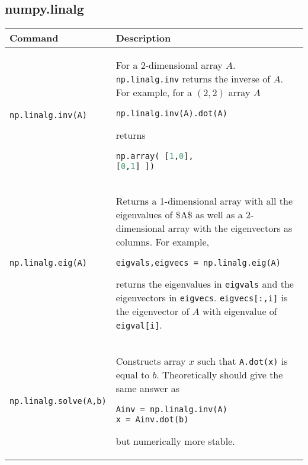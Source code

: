 \documentclass[]{article}
\begin{document}
\subsection{numpy.linalg}\label{numpy.linalg}

\begin{longtable}[]{@{}ll@{}}
\toprule
\begin{minipage}[b]{0.19\columnwidth}\raggedright\strut
Command\strut
\end{minipage} & \begin{minipage}[b]{0.75\columnwidth}\raggedright\strut
Description\strut
\end{minipage}\tabularnewline
\midrule
\endhead
\begin{minipage}[t]{0.19\columnwidth}\raggedright\strut
\lstinline!np.linalg.inv(A)!\strut
\end{minipage} & \begin{minipage}[t]{0.75\columnwidth}\raggedright\strut
For a 2-dimensional array \(A\). \lstinline!np.linalg.inv! returns the
inverse of \(A\). For example, for a \((2,2)\) array \(A\)

\begin{lstlisting}[language=Python]
np.linalg.inv(A).dot(A)
\end{lstlisting}

returns

\begin{lstlisting}[language=Python]
np.array( [1,0],
[0,1] ])
\end{lstlisting}
\strut
\end{minipage}\tabularnewline
\begin{minipage}[t]{0.19\columnwidth}\raggedright\strut
\lstinline!np.linalg.eig(A)!\strut
\end{minipage} & \begin{minipage}[t]{0.75\columnwidth}\raggedright\strut
Returns a 1-dimensional array with all the eigenvalues of \$A\$ as well
as a 2-dimensional array with the eigenvectors as columns. For example,

\lstinline!eigvals,eigvecs = np.linalg.eig(A)!

returns the eigenvalues in \lstinline!eigvals! and the eigenvectors in
\lstinline!eigvecs!. \lstinline!eigvecs[:,i]! is the eigenvector of
\(A\) with eigenvalue of \lstinline!eigval[i]!.\strut
\end{minipage}\tabularnewline
\begin{minipage}[t]{0.19\columnwidth}\raggedright\strut
\lstinline!np.linalg.solve(A,b)!\strut
\end{minipage} & \begin{minipage}[t]{0.75\columnwidth}\raggedright\strut
Constructs array \(x\) such that \lstinline!A.dot(x)! is equal to \(b\).
Theoretically should give the same answer as

\begin{lstlisting}[language=Python]
Ainv = np.linalg.inv(A)
x = Ainv.dot(b)
\end{lstlisting}

but numerically more stable.\strut
\end{minipage}\tabularnewline
\bottomrule
\end{longtable}
\end{document}
